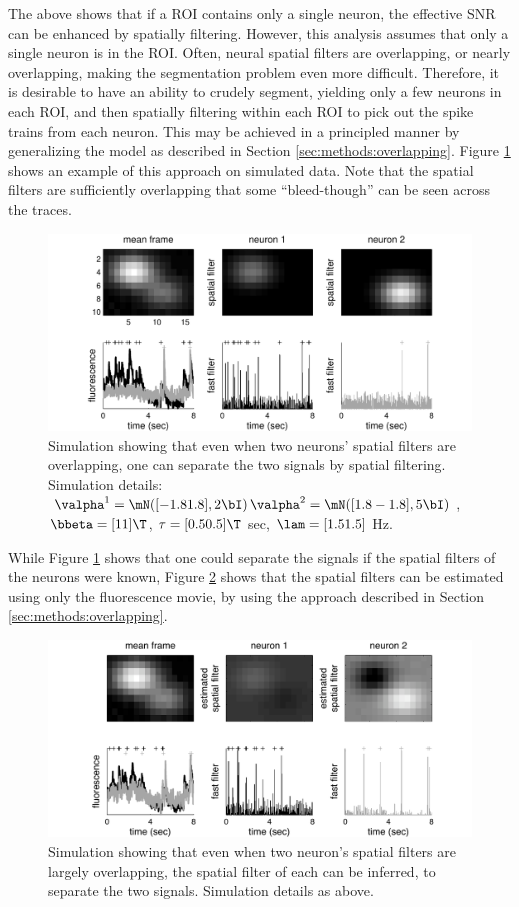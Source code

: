 The above shows that if a ROI contains only a single neuron, the effective SNR can be enhanced by spatially filtering.  However, this analysis assumes that only a single neuron is in the ROI.  Often, neural spatial filters are overlapping, or nearly overlapping, making the segmentation problem even more difficult.  Therefore, it is desirable to have an ability to crudely segment, yielding only a few neurons in each ROI, and then spatially filtering within each ROI to pick out the spike trains from each neuron.  This may be achieved in a principled manner by generalizing the model as described in Section \ref{sec:methods:overlapping}.  Figure \ref{fig:spatial_multi_inf} shows an example of this approach on simulated data. Note that the spatial filters are sufficiently overlapping that some ``bleed-though'' can be seen across the traces.  


\begin{figure}[h!]
\centering \includegraphics[width=.9\linewidth]{../figs/spatial_multi_inf}
\caption{Simulation showing that even when two neurons' spatial filters are overlapping, one can separate the two signals by spatial filtering. Simulation details: $\valpha^1=\mN([-1.8 1.8],2 \bI)\, \valpha^2=\mN([1.8 -1.8],5 \bI)$, $\bbeta=[1 1]\T$, $\tau=[0.5 0.5]\T$ sec, $\lam=[1.5 1.5]$ Hz.} \label{fig:spatial_multi_inf}
\end{figure}

While Figure \ref{fig:spatial_multi_inf} shows that one could separate the signals if the spatial filters of the neurons were known, Figure \ref{fig:spatial_multi_learn} shows that the spatial filters can be estimated using only the fluorescence movie, by using the approach described in Section \ref{sec:methods:overlapping}.


\begin{figure}[h!]
\centering \includegraphics[width=.9\linewidth]{../figs/spatial_multi_learn}
\caption{Simulation showing that even when two neuron's spatial filters are largely overlapping, the spatial filter of each can be inferred, to separate the two signals. Simulation details as above.} \label{fig:spatial_multi_learn}
\end{figure}


